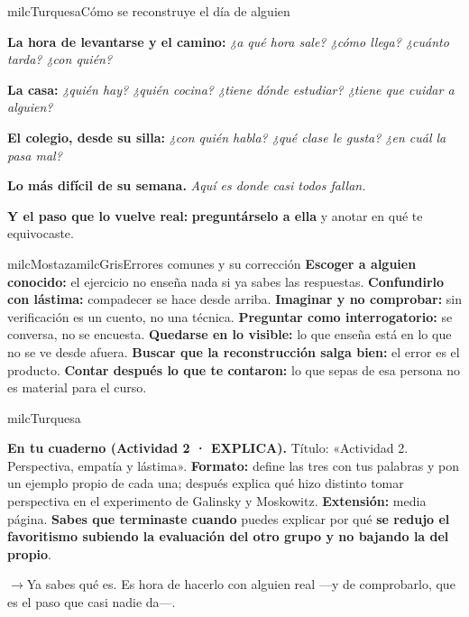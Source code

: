 \documentclass[11pt,letterpaper]{article}
\newcommand{\puente}[1]{%
  \begin{puentebox}%
    \textcolor{milcGradeDark}{$\rightarrow$}\hspace{2mm}#1%
  \end{puentebox}%
}
\begin{document}
\begin{drawbox}{milcTurquesa}{Cómo se reconstruye el día de alguien}
\begin{pasoslista}
\item \textbf{La hora de levantarse y el camino:} \emph{¿a qué hora sale? ¿cómo llega? ¿cuánto tarda? ¿con quién?}
\item \textbf{La casa:} \emph{¿quién hay? ¿quién cocina? ¿tiene dónde estudiar? ¿tiene que cuidar a alguien?}
\item \textbf{El colegio, desde su silla:} \emph{¿con quién habla? ¿qué clase le gusta? ¿en cuál la pasa mal?}
\item \textbf{Lo más difícil de su semana.} \emph{Aquí es donde casi todos fallan.}
\item \textbf{Y el paso que lo vuelve real:} \textbf{preguntárselo a ella} y anotar en qué te equivocaste.
\end{pasoslista}
\end{drawbox}

\begin{softbox}{milcMostaza}{milcGris}{Errores comunes y su corrección}
\textbf{Escoger a alguien conocido:} el ejercicio no enseña nada si ya sabes las respuestas. \textbf{Confundirlo con lástima:} compadecer se hace desde arriba. \textbf{Imaginar y no comprobar:} sin verificación es un cuento, no una técnica. \textbf{Preguntar como interrogatorio:} se conversa, no se encuesta. \textbf{Quedarse en lo visible:} lo que enseña está en lo que no se ve desde afuera. \textbf{Buscar que la reconstrucción salga bien:} el error es el producto. \textbf{Contar después lo que te contaron:} lo que sepas de esa persona no es material para el curso.
\end{softbox}

\begin{infoband}{milcTurquesa}


\textbf{En tu cuaderno (Actividad 2 · EXPLICA).} Título: «Actividad 2. Perspectiva, empatía y lástima». \textbf{Formato:} define las tres con tus palabras y pon un ejemplo propio de cada una; después explica qué hizo distinto tomar perspectiva en el experimento de Galinsky y Moskowitz. \textbf{Extensión:} media página. \textbf{Sabes que terminaste cuando} puedes explicar por qué \textbf{se redujo el favoritismo subiendo la evaluación del otro grupo y no bajando la del propio}.
\end{infoband}

\puente{Ya sabes qué es. Es hora de hacerlo con alguien real ---y de comprobarlo, que es el paso que casi nadie da---.}
\end{document}
